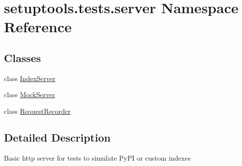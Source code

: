 \hypertarget{namespacesetuptools_1_1tests_1_1server}{}\section{setuptools.\+tests.\+server Namespace Reference}
\label{namespacesetuptools_1_1tests_1_1server}
\subsection*{Classes}
\begin{DoxyCompactItemize}
\item 
class \hyperlink{classsetuptools_1_1tests_1_1server_1_1IndexServer}{Index\+Server}
\item 
class \hyperlink{classsetuptools_1_1tests_1_1server_1_1MockServer}{Mock\+Server}
\item 
class \hyperlink{classsetuptools_1_1tests_1_1server_1_1RequestRecorder}{Request\+Recorder}
\end{DoxyCompactItemize}


\subsection{Detailed Description}
\begin{DoxyVerb}Basic http server for tests to simulate PyPI or custom indexes
\end{DoxyVerb}
 